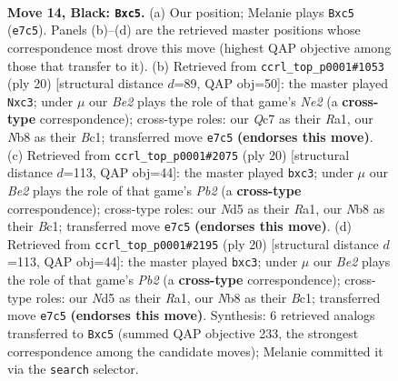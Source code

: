 \documentclass[11pt]{article}
\begin{document}
\clearpage

\begin{figure}[p]\centering
\begin{subfigure}{0.46\textwidth}\centering
\resizebox{\linewidth}{!}{%
\newchessgame
\chessboard[
  setfen={rnb1r1k1/ppq1bppp/8/2Pn4/P6P/5NP1/1P1N1PB1/R1BQ1RK1 b - - 0 14},
  showmover=false,
  pgfstyle=straightmove, color=movearrow, markmove={e7-c5}
]}
\caption{}
\end{subfigure}\hfill
\begin{subfigure}{0.46\textwidth}\centering
\resizebox{\linewidth}{!}{%
\newchessgame
\chessboard[
  setfen={r1bq1rk1/pp1n1ppp/4pn2/8/1PB5/2p1P3/1P2NPPP/R1BQ1RK1 w - - 0 11},
  showmover=false,
  pgfstyle=straightmove, color=movearrow, markmove={e2-c3}
]}
\caption{}
\end{subfigure}
\\[4pt]
\begin{subfigure}{0.46\textwidth}\centering
\resizebox{\linewidth}{!}{%
\newchessgame
\chessboard[
  setfen={r1bq1rk1/pp1n1ppp/4pn2/8/1PB5/2p1PN2/1P3PPP/R1BQ1RK1 w - - 0 11},
  showmover=false,
  pgfstyle=straightmove, color=movearrow, markmove={b2-c3}
]}
\caption{}
\end{subfigure}\hfill
\begin{subfigure}{0.46\textwidth}\centering
\resizebox{\linewidth}{!}{%
\newchessgame
\chessboard[
  setfen={r1bq1rk1/pp1n1ppp/4pn2/8/1PB5/2p1PN2/1P3PPP/R1BQ1RK1 w - - 0 11},
  showmover=false,
  pgfstyle=straightmove, color=movearrow, markmove={b2-c3}
]}
\caption{}
\end{subfigure}
\caption{\textbf{Move 14, Black: \texttt{Bxc5}.} (a) Our position; Melanie plays \texttt{Bxc5} (\texttt{e7c5}). Panels (b)--(d) are the retrieved master positions whose correspondence most drove this move (highest QAP objective among those that transfer to it). (b) Retrieved from \texttt{ccrl\_top\_p0001\#1053} (ply 20) [structural distance $d$=89, QAP obj=50]: the master played \texttt{Nxc3}; under $\mu$ our \emph{Be2} plays the role of that game's \emph{Ne2} (a \textbf{cross-type} correspondence); cross-type roles: our \emph{Q}c7 as their \emph{R}a1, our \emph{N}b8 as their \emph{B}c1; transferred move \texttt{e7c5} \textbf{(endorses this move)}. (c) Retrieved from \texttt{ccrl\_top\_p0001\#2075} (ply 20) [structural distance $d$=113, QAP obj=44]: the master played \texttt{bxc3}; under $\mu$ our \emph{Be2} plays the role of that game's \emph{Pb2} (a \textbf{cross-type} correspondence); cross-type roles: our \emph{N}d5 as their \emph{R}a1, our \emph{N}b8 as their \emph{B}c1; transferred move \texttt{e7c5} \textbf{(endorses this move)}. (d) Retrieved from \texttt{ccrl\_top\_p0001\#2195} (ply 20) [structural distance $d$=113, QAP obj=44]: the master played \texttt{bxc3}; under $\mu$ our \emph{Be2} plays the role of that game's \emph{Pb2} (a \textbf{cross-type} correspondence); cross-type roles: our \emph{N}d5 as their \emph{R}a1, our \emph{N}b8 as their \emph{B}c1; transferred move \texttt{e7c5} \textbf{(endorses this move)}. Synthesis: 6 retrieved analogs transferred to \texttt{Bxc5} (summed QAP objective 233, the strongest correspondence among the candidate moves); Melanie committed it via the \texttt{search} selector.}
\label{fig:thought-m27}
\end{figure}
\end{document}
